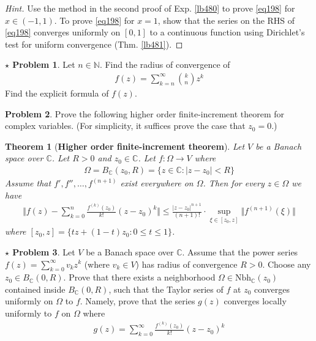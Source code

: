 \documentclass[12pt,b5paper,notitlepage]{article}
\theoremstyle{definition}
\newtheorem{prob}{\color{red}Problem}[section]
\newtheorem{sprob}[prob]{\color{red}$\star$ Problem}
\theoremstyle{plain}
\newtheorem{thm}[df]{Theorem}
\newcommand{\Cbb}{\mathbb C}
\newcommand{\Nbb}{\mathbb N}
\newcommand{\Nbh}{\mathrm{Nbh}}
\numberwithin{equation}{section}
\begin{document}
\begin{proof}[Hint]
Use the method in the second proof of Exp. \ref{lb480} to prove \eqref{eq198} for $x\in(-1,1)$. To prove \eqref{eq198} for $x=1$, show that the series on the RHS of \eqref{eq198} converges uniformly on $[0,1]$ to a continuous function using Dirichlet's test for uniform convergence (Thm. \ref{lb481}).
\end{proof}







\begin{sprob}\label{lb357}
Let $n\in\Nbb$. Find the radius of convergence of
\begin{align}
f(z)=\sum_{k=n}^\infty {k\choose n}z^k
\end{align}
Find the explicit formula of $f(z)$.
\end{sprob}



\begin{prob}
Prove the following higher order finite-increment theorem for complex variables. (For simplicity, it suffices prove the case that $z_0=0$.)
\end{prob}

\begin{thm}[\textbf{Higher order finite-increment theorem}]  \label{lb356}
Let $V$ be a Banach space over $\Cbb$. Let $R>0$ and $z_0\in\Cbb$. Let $f:\Omega\rightarrow V$ where
\begin{align*}
\Omega=B_\Cbb(z_0,R)=\{z\in\Cbb:|z-z_0|<R\}
\end{align*}
Assume that $f',f'',\dots,f^{(n+1)}$ exist everywhere on $\Omega$. Then for every $z\in\Omega$ we have
\begin{align}
\Big\Vert f(z)-\sum_{k=0}^n\frac{f^{(k)}(z_0)}{k!}(z-z_0)^k \Big\Vert \leq\frac{|z-z_0|^{n+1}}{(n+1)!}\cdot \sup_{\xi\in[z_0,z]} \Vert f^{(n+1)}(\xi)\Vert
\end{align}
where $[z_0,z]=\{tz+(1-t)z_0:0\leq t\leq 1\}$.
\end{thm}



\begin{sprob}
Let $V$ be a Banach space over $\Cbb$. Assume that the power series $f(z)=\sum_{k=0}^\infty v_kz^k$ (where $v_k\in V$) has radius of convergence $R>0$. Choose any $z_0\in B_\Cbb(0,R)$. Prove that there exists a neighborhood $\Omega\in\Nbh_\Cbb(z_0)$ contained inside $B_\Cbb(0,R)$, such that the Taylor series of $f$ at $z_0$ converges uniformly on $\Omega$ to $f$. Namely, prove that the series $g(z)$ converges locally uniformly to $f$ on $\Omega$ where
\begin{align}
g(z)=\sum_{k=0}^\infty\frac{f^{(k)}(z_0)}{k!}(z-z_0)^k
\end{align}
\end{sprob}
\end{document}
